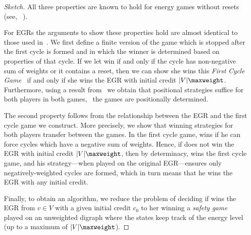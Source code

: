 \documentclass[a4paper]{article}
\begin{document}
\begin{proof}[Sketch]
	All three properties are known to hold for energy games without
	resets (see, \eg~\cite{cdahs03,bcdgr09}).

	For EGRs the arguments to show these properties hold are
	almost identical to those used in~\cite{bcdgr09}. We first define a
	finite version of the game which is stopped after the first cycle is
	formed and in which the winner is determined based on properties of that
	cycle. If we let \eve win if and only if the cycle has non-negative sum
	of weights or it contains a reset, then we can show she wins this
	\emph{First Cycle Game}~\cite{ar14} if and only if she wins the EGR with
	initial credit $|V|\maxweight$. Furthermore, using a result
	from~\cite{ar14} we obtain that positional strategies suffice for both
	players in both games, \ie~the games are positionally determined.
	
	The second property follows from the relationship between the EGR and the
	first cycle game we construct. More precisely, we show that winning
	strategies for both players transfer between the games. In the first
	cycle game, \adam wins if he can force cycles which have a negative sum
	of weights. Hence, if \eve does not win the EGR with initial credit
	$|V|\maxweight$, then by determinacy, \adam wins the first cycle game,
	and his strategy---when played on the original EGR---ensures only
	negatively-weighted cycles are formed, which in turn means that he wins
	the EGR with any initial credit.
	
	Finally, to obtain an algorithm, we reduce the problem of deciding if
	\eve wins the EGR from $v \in V$ with a given initial credit $c_0$ to
	her winning a \emph{safety game}~\cite{ag11} played on an unweighted
	digraph where the states keep track of the energy level (up to a maximum
	of $|V|\maxweight$).
\end{proof}
\end{document}
